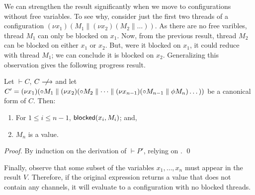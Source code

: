 \documentclass[oribibl,orivec,envcountsame]{llncs}
\begin{document}
We can strengthen the result significantly when we move to configurations without free variables.
To see why, consider just the first two threads of a configuration $(\nu x_1)(M_1 \parallel (\nu
x_2)(M_2 \parallel \dots))$.  As there are no free varibles, thread $M_1$ can only be blocked on
$x_1$.  Now, from the previous result, thread $M_2$ can be blocked on either $x_1$ or $x_2$.  But,
were it blocked on $x_1$, it could reduce with thread $M_1$; we can conclude it is blocked on $x_2$.
Generalizing this observation gives the following progress result.
%
\begin{corollary}\label{thm:progress}
  Let $\vdash C$, $C \centernot\ceval$ and let $C' = (\nu x_1)({\mathord{\circ}} M_1 \parallel (\nu
  x_2)({\mathord{\circ}} M_2 \parallel \dots \parallel (\nu x_{n-1})({\mathord{\circ}} M_{n-1} \parallel
  \phi M_n)\dots))$ be a canonical form of $C$.  Then:
  \begin{enumerate}
  \item For $1 \leq i \leq n - 1$, $\mathsf{blocked}(x_i,M_i)$; and,
  \item $M_n$ is a value.
  \end{enumerate}
\end{corollary}
%
\begin{proof}
  By induction on the derivation of $\vdash P'$, relying on .  \qed
\end{proof}
%
Finally, observe that some subset of the variables $x_1,\dots,x_n$ must appear in the result $V$.
Therefore, if the original expression returns a value that does not contain any channels, it will
evaluate to a configuration with no blocked threads.
\end{document}
